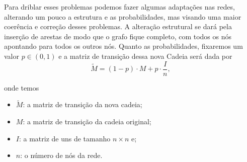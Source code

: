 \documentclass{article}
\begin{document}
Para driblar esses problemas podemos fazer algumas adaptações nas redes, alterando um pouco a estrutura e as probabilidades, mas visando uma maior coerência e correção desses problemas. A alteração estrutural se dará pela inserção de arestas de modo que o grafo fique completo, com todos os nós apontando para todos os outros nós. Quanto as probabilidades, fixaremos um valor $p\in (0, 1)$ e a matriz de transição dessa nova Cadeia será dada por
\[\tilde{M} = (1 - p)\cdot M + p\cdot \dfrac{I}{n},\]

\noindent onde temos
\begin{itemize}
    \item
        $\tilde{M}$: a matriz de transição da nova cadeia;
        
    \item
        $M$: a matriz de transição da cadeia original;
        
    \item
        $I$: a matriz de uns de tamanho $n\times n$ e;
        
    \item
        $n$: o número de nós da rede.
\end{itemize}
\end{document}
